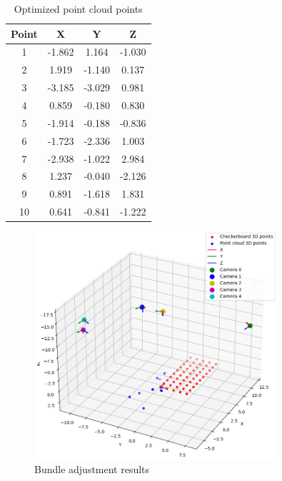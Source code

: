 \documentclass{article}
\begin{document}
\begin{table}[h]
    \centering
    \begin{tabular}{|c|c|c|c|}
    \hline
    Point & X & Y & Z \\
    \hline
    1 & -1.862 & 1.164 & -1.030 \\
    2 & 1.919 & -1.140 & 0.137 \\
    3 & -3.185 & -3.029 & 0.981 \\
    4 & 0.859 & -0.180 & 0.830 \\
    5 & -1.914 & -0.188 & -0.836 \\
    6 & -1.723 & -2.336 & 1.003 \\
    7 & -2.938 & -1.022 & 2.984 \\
    8 & 1.237 & -0.040 & -2.126 \\
    9 & 0.891 & -1.618 & 1.831 \\
    10 & 0.641 & -0.841 & -1.222 \\
    \hline
    \end{tabular}
    \caption{Optimized point cloud points}
    \label{tab:optimized_point_cloud_points}
\end{table}


\pagebreak

\begin{figure}[h]
    \centering
    \includegraphics[width=0.8\textwidth]{images/bundle_adjustment_results.png}
    \caption{Bundle adjustment results}
    \label{fig:bundle_adjustment_results}
\end{figure}
\end{document}
